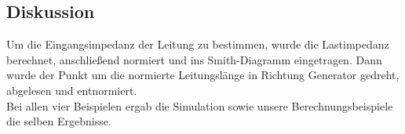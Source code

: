 \documentclass[12pt,a4paper,ngerman]{article}
\begin{document}
\subsection{Diskussion}
Um die Eingangsimpedanz der Leitung zu bestimmen, wurde die Lastimpedanz berechnet, anschließend normiert und ins Smith-Diagramm eingetragen. Dann wurde der Punkt um die normierte Leitungslänge in Richtung Generator gedreht, abgelesen und entnormiert. \\
Bei allen vier Beispielen ergab die Simulation sowie unsere Berechnungsbeispiele die selben Ergebnisse. 











 



   
\end{document}

